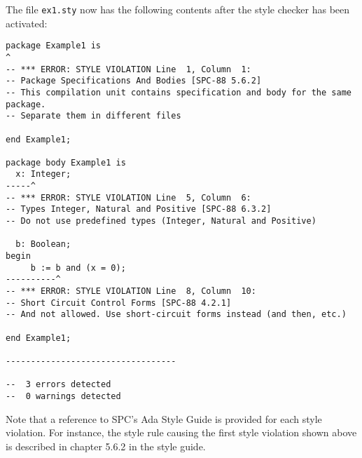 The file {\tt ex1.sty} now has the following contents after the style
checker has been activated:

\begin{verbatim}
package Example1 is
^
-- *** ERROR: STYLE VIOLATION Line  1, Column  1:
-- Package Specifications And Bodies [SPC-88 5.6.2]
-- This compilation unit contains specification and body for the same package.
-- Separate them in different files

end Example1;

package body Example1 is
  x: Integer;
-----^
-- *** ERROR: STYLE VIOLATION Line  5, Column  6:
-- Types Integer, Natural and Positive [SPC-88 6.3.2]
-- Do not use predefined types (Integer, Natural and Positive)

  b: Boolean;
begin
     b := b and (x = 0);
----------^
-- *** ERROR: STYLE VIOLATION Line  8, Column  10:
-- Short Circuit Control Forms [SPC-88 4.2.1]
-- And not allowed. Use short-circuit forms instead (and then, etc.)

end Example1;

----------------------------------

--  3 errors detected
--  0 warnings detected
\end{verbatim}

Note that a reference to SPC's Ada Style Guide is provided for each 
style violation. For instance, the style rule causing the first style
violation shown above is described in chapter 5.6.2 in the style guide.

